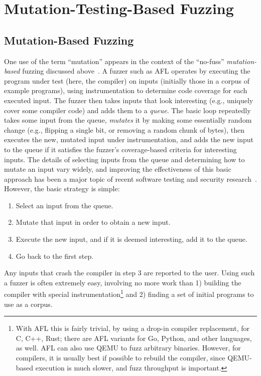 \section{Mutation-Testing-Based Fuzzing}



\subsection{Mutation-Based Fuzzing}

One use of the term ``mutation'' appears in the context of the ``no-fuss'' \emph{mutation-based} fuzzing discussed above~\cite{ArtFuzz}.  A fuzzer such as AFL operates by executing the program under test (here, the compiler) on inputs (initially those in a corpus of example programs), using instrumentation to determine code coverage for each executed input.  The fuzzer then takes inputs that look interesting (e.g., uniquely cover some compiler code) and adds them to a \emph{queue}.  The basic loop repeatedly takes some input from the queue, \emph{mutates} it by making some essentially random change (e.g., flipping a single bit, or removing a random chunk of bytes), then executes the new, mutated input under instrumentation, and adds the new input to the queue if it satisfies the fuzzer's coverage-based criteria for interesting inputs.  The details of selecting inputs from the queue and determining how to mutate an input vary widely, and improving the effectiveness of this basic approach has been a major topic of recent software testing and security research~\cite{evalfuzz,BoehmeCR21,ArtFuzz}.  However, the basic strategy is simple:

\begin{enumerate}
\item Select an input from the queue.
\item Mutate that input in order to obtain a new input.
\item Execute the new input, and if it is deemed interesting, add it to the queue.
\item Go back to the first step.
\end{enumerate}

Any inputs that crash the compiler in step 3 are reported to the user.  Using such a fuzzer is often extremely easy, involving no more work than 1) building the compiler with special instrumentation\footnote{With AFL this is fairly trivial, by using a drop-in compiler replacement, for C, C++, Rust; there are AFL variants for Go, Python, and other languages, as well.  AFL can also use QEMU to fuzz arbitrary binaries.  However, for compilers, it is usually best if possible to rebuild the compiler, since QEMU-based execution is much slower, and fuzz throughput is important.} and 2) finding a set of initial programs to use as a corpus.  


